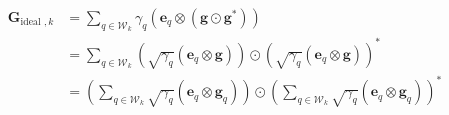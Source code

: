 \begin{align}
\mathbf{G}_{\text {ideal }, k} &= \sum_{q \in \mathcal{W}_k}\gamma_q\left(\mathbf{e}_{q} \otimes\left(\mathbf{g} \odot \mathbf{g}^{*}\right)\right) \nonumber\\
&=\sum_{q \in \mathcal{W}_k}\left(\sqrt{\gamma_q}\left(\mathbf{e}_{q} \otimes \mathbf{g}\right)\right) \odot\left(\sqrt{{\gamma_q}}\left(\mathbf{e}_{q} \otimes \mathbf{g}\right)\right)^{*} \nonumber\\
&=\left(\sum_{q \in \mathcal{W}_k}\sqrt{\gamma_q}\left(\mathbf{e}_{q} \otimes \mathbf{g}_q\right)\right)  \odot \left(\sum_{q \in \mathcal{W}_k}\sqrt{\gamma_q}\left(\mathbf{e}_{q} \otimes \mathbf{g}_q\right)\right)^{*} \label{final_gik}
\end{align}

























